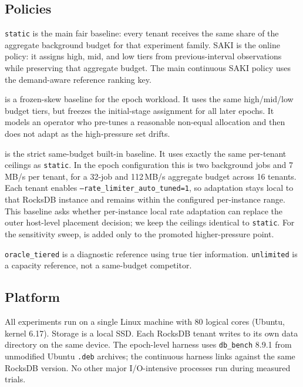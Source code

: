 \subsection{Policies}

\texttt{static} is the main fair baseline: every tenant receives the same share
of the aggregate background budget for that experiment family. SAKI is the
online policy: it assigns high, mid, and low tiers from previous-interval
observations while preserving that aggregate budget. The main continuous SAKI
policy uses the demand-aware reference ranking key.

\staticbiased is a frozen-skew baseline for the epoch workload. It uses the
same high/mid/low budget tiers, but freezes the initial-stage assignment for
all later epochs. It models an operator who pre-tunes a reasonable non-equal
allocation and then does not adapt as the high-pressure set drifts.

\staticautotuned is the strict same-budget built-in \rocksdb baseline. It uses
exactly the same per-tenant ceilings as \texttt{static}. In the epoch
configuration this is two background jobs and 7\,MB/s per tenant, for a 32-job
and 112\,MB/s aggregate budget across 16 tenants. Each tenant enables
\texttt{--rate\_limiter\_auto\_tuned=1}, so adaptation stays local to that
RocksDB instance and remains within the configured per-instance range. This
baseline asks whether per-instance local rate adaptation can replace the outer
host-level placement decision; we keep the ceilings identical to \texttt{static}.
For the sensitivity sweep, \staticautotuned is added only to the promoted
higher-pressure point.

\texttt{oracle\_tiered} is a diagnostic reference using true tier information.
\texttt{unlimited} is a capacity reference, not a same-budget competitor.

\subsection{Platform}
\label{sec:platform}

All experiments run on a single Linux machine with 80 logical cores (Ubuntu,
kernel 6.17). Storage is a local SSD. Each RocksDB tenant writes to its own
data directory on the same device. The epoch-level harness uses \texttt{db\_bench}
8.9.1 from unmodified Ubuntu \texttt{.deb} archives; the continuous harness
links against the same RocksDB version. No other major I/O-intensive processes
run during measured trials.

